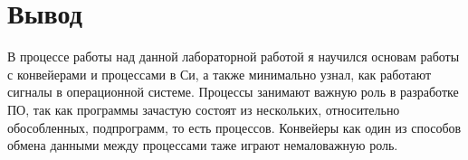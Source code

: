 \section{Вывод}

В процессе работы над данной лабораторной работой я научился основам работы с конвейерами и процессами в Си, а также минимально узнал, как работают сигналы в операционной системе. Процессы занимают важную роль в разработке ПО, так как программы зачастую состоят из нескольких, относительно обособленных, подпрограмм, то есть процессов. Конвейеры как один из способов обмена данными между процессами таже играют немаловажную роль.


